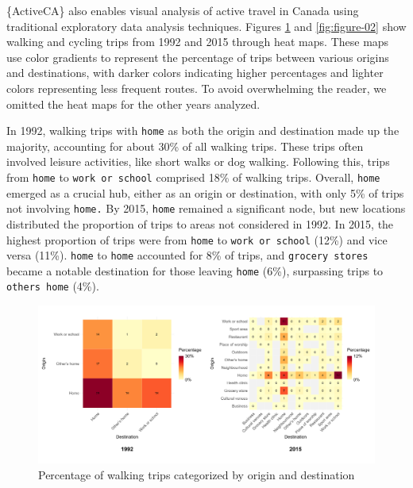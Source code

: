 \documentclass[Royal,times,sageh]{sagej}
\begin{document}
\{ActiveCA\} also enables visual analysis of active travel in Canada
using traditional exploratory data analysis techniques. Figures
\ref{fig:figure-01} and \ref{fig:figure-02} show walking and cycling
trips from 1992 and 2015 through heat maps. These maps use color
gradients to represent the percentage of trips between various origins
and destinations, with darker colors indicating higher percentages and
lighter colors representing less frequent routes. To avoid overwhelming
the reader, we omitted the heat maps for the other years analyzed.

In 1992, walking trips with \texttt{home} as both the origin and
destination made up the majority, accounting for about 30\% of all
walking trips. These trips often involved leisure activities, like short
walks or dog walking. Following this, trips from \texttt{home} to
\texttt{work\ or\ school} comprised 18\% of walking trips. Overall,
\texttt{home} emerged as a crucial hub, either as an origin or
destination, with only 5\% of trips not involving \texttt{home.} By
2015, \texttt{home} remained a significant node, but new locations
distributed the proportion of trips to areas not considered in 1992. In
2015, the highest proportion of trips were from \texttt{home} to
\texttt{work\ or\ school} (12\%) and vice versa (11\%). \texttt{home} to
\texttt{home} accounted for 8\% of trips, and \texttt{grocery\ stores}
became a notable destination for those leaving \texttt{home} (6\%),
surpassing trips to \texttt{other\textquotesingle{}s\ home} (4\%).

\begin{figure}

{\centering \includegraphics[width=1\linewidth]{Manuscript-figures/walking_hm_fig} 

}

\caption{Percentage of walking trips categorized by origin and destination}\label{fig:figure-01}
\end{figure}
\end{document}
